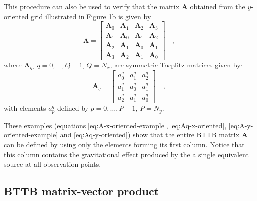 \documentclass[manuscript,revised]{geophysics}
\begin{document}
This procedure can also be used to verify that the matrix $\mathbf{A}$ obtained
from the $y$-oriented grid illustrated in Figure 1b is given by
\begin{equation}
\mathbf{A} = \begin{bmatrix}
\mathbf{A}_{0} & \mathbf{A}_{1} & \mathbf{A}_{2} & \mathbf{A}_{3} \\
\mathbf{A}_{1} & \mathbf{A}_{0} & \mathbf{A}_{1} & \mathbf{A}_{2} \\
\mathbf{A}_{2} & \mathbf{A}_{1} & \mathbf{A}_{0} & \mathbf{A}_{1} \\
\mathbf{A}_{3} & \mathbf{A}_{2} & \mathbf{A}_{1} & \mathbf{A}_{0}
\end{bmatrix} \quad ,
\label{eq:A-y-oriented-example}
\end{equation}
where $\mathbf{A}_{q}$, $q = 0, \dots, Q - 1$, $Q = N_{x}$, 
are symmetric Toeplitz matrices given by:
\begin{equation}
\mathbf{A}_{q} = \begin{bmatrix}
a^{q}_{0} & a^{q}_{1} & a^{q}_{2} \\
a^{q}_{1} & a^{q}_{0} & a^{q}_{1} \\
a^{q}_{2} & a^{q}_{1} & a^{q}_{0}
\end{bmatrix} \quad ,
\label{eq:Aq-y-oriented}
\end{equation}
with elements $a^{q}_{p}$ defined by $p = 0, \dots, P - 1$, $P = N_{y}$.

These examples (equations \ref{eq:A-x-oriented-example}, \ref{eq:Aq-x-oriented}, 
\ref{eq:A-y-oriented-example} and \ref{eq:Aq-y-oriented}) show that the entire 
BTTB matrix $\mathbf{A}$ can be defined by using only the elements forming its first 
column. Notice that this column contains the gravitational effect produced by the a single 
equivalent source at all observation points.

\subsection{BTTB matrix-vector product}
\end{document}
